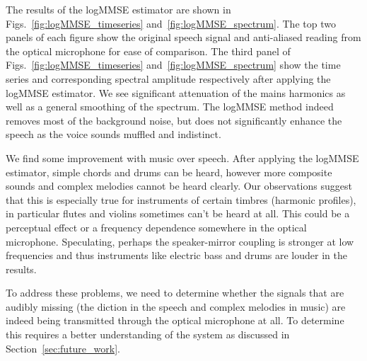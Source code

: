 \documentclass[paper-main.tex]{subfiles}
\begin{document}
 



The results of the logMMSE estimator are shown in Figs.~\ref{fig:logMMSE_timeseries} and~\ref{fig:logMMSE_spectrum}. The top two panels of each figure show the original speech signal and anti-aliased reading from the optical microphone for ease of comparison. The third panel of Figs.~\ref{fig:logMMSE_timeseries} and~\ref{fig:logMMSE_spectrum} show the time series and corresponding spectral amplitude respectively after applying the logMMSE estimator. We see significant attenuation of the mains harmonics as well as a general smoothing of the spectrum. The logMMSE method indeed removes most of the background noise, but does not significantly enhance the speech as the voice sounds muffled and indistinct.


We find some improvement with music over speech. After applying the logMMSE estimator, simple chords and drums can be heard, however more composite sounds and complex melodies cannot be heard clearly. Our observations suggest that this is especially true for instruments of certain timbres (harmonic profiles), in particular flutes and violins sometimes can’t be heard at all. This could be a perceptual effect or a frequency dependence somewhere in the optical microphone.
Speculating, perhaps the speaker-mirror coupling is stronger at low frequencies and thus instruments like electric bass and drums are louder in the results.


To address these problems, we need to determine whether the signals that are audibly missing (the diction in the speech and complex melodies in music) are indeed being transmitted through the optical microphone at all. 
To determine this requires a better understanding of the system as discussed in Section~\ref{sec:future_work}.
\end{document}
